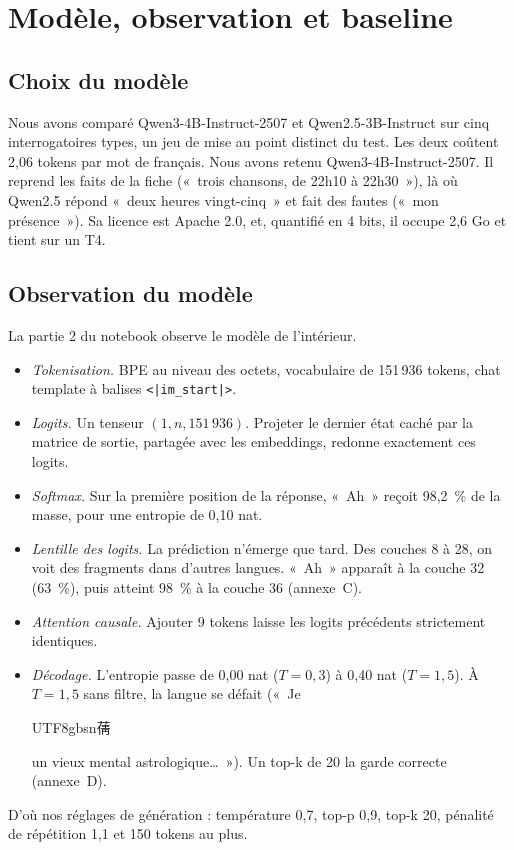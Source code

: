 \documentclass[11pt,a4paper]{article}
\newcommand{\cjk}[1]{\begin{CJK*}{UTF8}{gbsn}#1\end{CJK*}}
\begin{document}
\section{Modèle, observation et baseline}

\subsection{Choix du modèle}

Nous avons comparé Qwen3-4B-Instruct-2507 et Qwen2.5-3B-Instruct sur cinq interrogatoires types, un jeu de mise au point distinct du test. Les deux coûtent 2,06 tokens par mot de français. Nous avons retenu Qwen3-4B-Instruct-2507. Il reprend les faits de la fiche («~trois chansons, de 22h10 à 22h30~»), là où Qwen2.5 répond «~deux heures vingt-cinq~» et fait des fautes («~mon présence~»). Sa licence est Apache 2.0, et, quantifié en 4 bits, il occupe 2,6 Go et tient sur un T4.

\subsection{Observation du modèle}

La partie 2 du notebook observe le modèle de l'intérieur.
\begin{itemize}
  \item \emph{Tokenisation.} BPE au niveau des octets, vocabulaire de 151\,936 tokens, chat template à balises \texttt{<|im\_start|>}.
  \item \emph{Logits.} Un tenseur $(1, n, 151\,936)$. Projeter le dernier état caché par la matrice de sortie, partagée avec les embeddings, redonne exactement ces logits.
  \item \emph{Softmax.} Sur la première position de la réponse, «~Ah~» reçoit 98,2~\% de la masse, pour une entropie de 0,10 nat.
  \item \emph{Lentille des logits.} La prédiction n'émerge que tard. Des couches 8 à 28, on voit des fragments dans d'autres langues. «~Ah~» apparaît à la couche 32 (63~\%), puis atteint 98~\% à la couche 36 (annexe~C).
  \item \emph{Attention causale.} Ajouter 9 tokens laisse les logits précédents strictement identiques.
  \item \emph{Décodage.} L'entropie passe de 0,00 nat ($T = 0{,}3$) à 0,40 nat ($T = 1{,}5$). À $T = 1{,}5$ sans filtre, la langue se défait («~Je\cjk{蒨} un vieux mental astrologique\ldots~»). Un top-k de 20 la garde correcte (annexe~D).
\end{itemize}
D'où nos réglages de génération : température 0,7, top-p 0,9, top-k 20, pénalité de répétition 1,1 et 150 tokens au plus.
\end{document}
